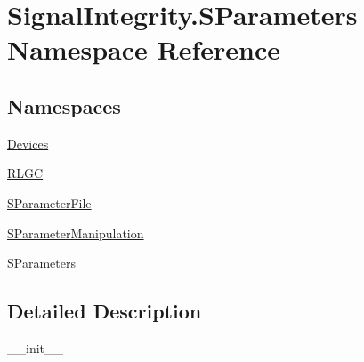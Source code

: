 \hypertarget{namespaceSignalIntegrity_1_1SParameters}{}\section{Signal\+Integrity.\+S\+Parameters Namespace Reference}
\label{namespaceSignalIntegrity_1_1SParameters}
\subsection*{Namespaces}
\begin{DoxyCompactItemize}
\item 
 \hyperlink{namespaceSignalIntegrity_1_1SParameters_1_1Devices}{Devices}
\item 
 \hyperlink{namespaceSignalIntegrity_1_1SParameters_1_1RLGC}{R\+L\+GC}
\item 
 \hyperlink{namespaceSignalIntegrity_1_1SParameters_1_1SParameterFile}{S\+Parameter\+File}
\item 
 \hyperlink{namespaceSignalIntegrity_1_1SParameters_1_1SParameterManipulation}{S\+Parameter\+Manipulation}
\item 
 \hyperlink{namespaceSignalIntegrity_1_1SParameters_1_1SParameters}{S\+Parameters}
\end{DoxyCompactItemize}


\subsection{Detailed Description}
\begin{DoxyVerb}__init__\end{DoxyVerb}
 